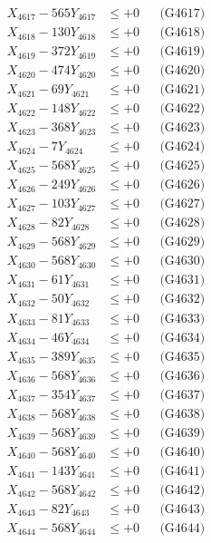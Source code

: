 \documentclass[a4paper,10pt]{article}
\begin{document}
{\begin{align}
X_{4617} - 565Y_{4617} &\leq +0 && \text{(G4617)} \\
X_{4618} - 130Y_{4618} &\leq +0 && \text{(G4618)} \\
X_{4619} - 372Y_{4619} &\leq +0 && \text{(G4619)} \\
X_{4620} - 474Y_{4620} &\leq +0 && \text{(G4620)} \\
\allowbreak
X_{4621} - 69Y_{4621} &\leq +0 && \text{(G4621)} \\
X_{4622} - 148Y_{4622} &\leq +0 && \text{(G4622)} \\
X_{4623} - 368Y_{4623} &\leq +0 && \text{(G4623)} \\
X_{4624} - 7Y_{4624} &\leq +0 && \text{(G4624)} \\
X_{4625} - 568Y_{4625} &\leq +0 && \text{(G4625)} \\
X_{4626} - 249Y_{4626} &\leq +0 && \text{(G4626)} \\
X_{4627} - 103Y_{4627} &\leq +0 && \text{(G4627)} \\
X_{4628} - 82Y_{4628} &\leq +0 && \text{(G4628)} \\
X_{4629} - 568Y_{4629} &\leq +0 && \text{(G4629)} \\
X_{4630} - 568Y_{4630} &\leq +0 && \text{(G4630)} \\
\allowbreak
X_{4631} - 61Y_{4631} &\leq +0 && \text{(G4631)} \\
X_{4632} - 50Y_{4632} &\leq +0 && \text{(G4632)} \\
X_{4633} - 81Y_{4633} &\leq +0 && \text{(G4633)} \\
X_{4634} - 46Y_{4634} &\leq +0 && \text{(G4634)} \\
X_{4635} - 389Y_{4635} &\leq +0 && \text{(G4635)} \\
X_{4636} - 568Y_{4636} &\leq +0 && \text{(G4636)} \\
X_{4637} - 354Y_{4637} &\leq +0 && \text{(G4637)} \\
X_{4638} - 568Y_{4638} &\leq +0 && \text{(G4638)} \\
X_{4639} - 568Y_{4639} &\leq +0 && \text{(G4639)} \\
X_{4640} - 568Y_{4640} &\leq +0 && \text{(G4640)} \\
\allowbreak
X_{4641} - 143Y_{4641} &\leq +0 && \text{(G4641)} \\
X_{4642} - 568Y_{4642} &\leq +0 && \text{(G4642)} \\
X_{4643} - 82Y_{4643} &\leq +0 && \text{(G4643)} \\
X_{4644} - 568Y_{4644} &\leq +0 && \text{(G4644)} \\

\end{align}}
\end{document}

